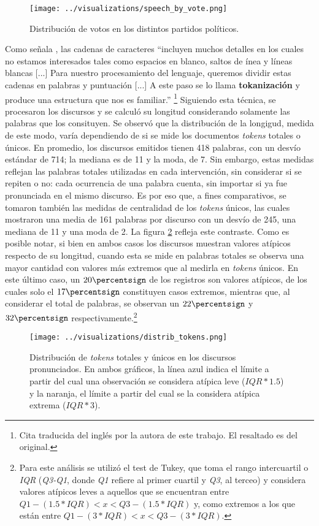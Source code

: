 \begin{figure}[h!]
    \centering
    \texttt{[image: ../visualizations/speech\_by\_vote.png]}
    \caption{Distribuci\'on de votos en los distintos partidos pol\'iticos.}%
    \label{fig-distrib-speech}
\end{figure}

Como señala \cite{bird2009natural}, las cadenas de caracteres ``incluyen muchos detalles
en los cuales no estamos interesados tales como espacios en blanco, saltos de \'inea
y l\'ineas blancas [...] Para nuestro procesamiento del lenguaje, queremos dividir
estas cadenas en palabras y puntuaci\'on  [...] A este paso se lo llama
\textbf{tokanizaci\'on} y produce una estructura que nos es familiar.''
\footnote{Cita traducida del ingl\'es por la autora de este trabajo.
El resaltado es del original.}
Siguiendo esta t\'ecnica, se procesaron los discursos y se calcul\'o su
longitud considerando solamente las palabras que los consituyen.
Se observ\'o que la distribuci\'on de la longigud, medida de este modo, var\'ia
dependiendo de si se mide los documentos \textit{tokens} totales o \'unicos.
En promedio, los discursos emitidos tienen 418 palabras, con un desv\'io
est\'andar de 714; la mediana es de 11 y la moda, de 7. Sin embargo, estas medidas
reflejan las palabras totales utilizadas en cada intervenci\'on, sin considerar si se repiten
o no: cada ocurrencia de una palabra cuenta, sin importar si ya fue pronunciada en el mismo
discurso. Es por eso que, a fines comparativos, se tomaron tambi\'en las medidas de centralidad
de los \textit{tokens} \'unicos, las cuales mostraron una media de 161 palabras por discurso
con un desv\'io de 245, una mediana de 11 y una moda de 2. La figura \ref{fig-distrib-tokens}
refleja este contraste. Como es posible notar, si bien en ambos casos los discursos
muestran valores at\'ipicos respecto de su longitud, cuando esta se mide en palabras
totales se observa una mayor cantidad con valores m\'as extremos que
al medirla en \textit{tokens} \'unicos. En este \'ultimo caso, un
$20\percentsign$ de los registros son valores at\'ipicos, de los cuales solo el
$17\percentsign$ constituyen casos extremos, mientras que, al considerar
el total de palabras, se observan un $22\percentsign$ y $32\percentsign$
respectivamente.\footnote{Para este an\'alisis se utiliz\'o el
test de Tukey, que toma el rango intercuartil o \textit{IQR} (\textit{Q3-Q1}, donde
\textit{Q1} refiere al primer cuartil y \textit{Q3}, al terceo) y considera
valores at\'ipicos leves a aquellos que se encuentran entre
$Q1 - (1.5 * IQR) < x < Q3 - (1.5 * IQR)$ y, como extremos a los que est\'an entre
$Q1 - (3 * IQR) < x < Q3 - (3 * IQR)$.}

\begin{figure}[h!]%
    \centering%
    \texttt{[image: ../visualizations/distrib\_tokens.png]}%
    \caption{Distribuci\'on de \textit{tokens} totales y \'unicos en los discursos pronunciados. En ambos gr\'aficos,
    la l\'inea azul indica el l\'imite a partir del cual una observaci\'on se considera at\'ipica leve
    ($IQR*1.5$) y la naranja, el l\'imite a partir del cual se la considera at\'ipica extrema ($IQR*3$).}%
    \label{fig-distrib-tokens}%
\end{figure}%
